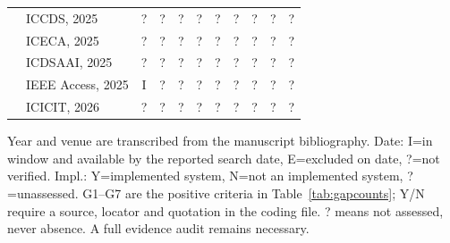 \begin{table}[t]
\begin{tabular}{@{}llccccccccc@{}}
\cite{b21} & ICCDS, 2025 & ? & ? & ? & ? & ? & ? & ? & ? & ? \\
\cite{b22} & ICECA, 2025 & ? & ? & ? & ? & ? & ? & ? & ? & ? \\
\cite{b23} & ICDSAAI, 2025 & ? & ? & ? & ? & ? & ? & ? & ? & ? \\
\cite{b24} & IEEE Access, 2025 & I & ? & ? & ? & ? & ? & ? & ? & ? \\
\cite{b25} & ICICIT, 2026 & ? & ? & ? & ? & ? & ? & ? & ? & ? \\
\bottomrule\end{tabular}
\par\smallskip\parbox{0.96\textwidth}{\scriptsize Year and venue are transcribed from the manuscript bibliography. Date: I=in window and available by the reported search date, E=excluded on date, ?=not verified. Impl.: Y=implemented system, N=not an implemented system, ?=unassessed. G1--G7 are the positive criteria in Table~\ref{tab:gapcounts}; Y/N require a source, locator and quotation in the coding file. ? means not assessed, never absence. A full evidence audit remains necessary.}
\end{table}
